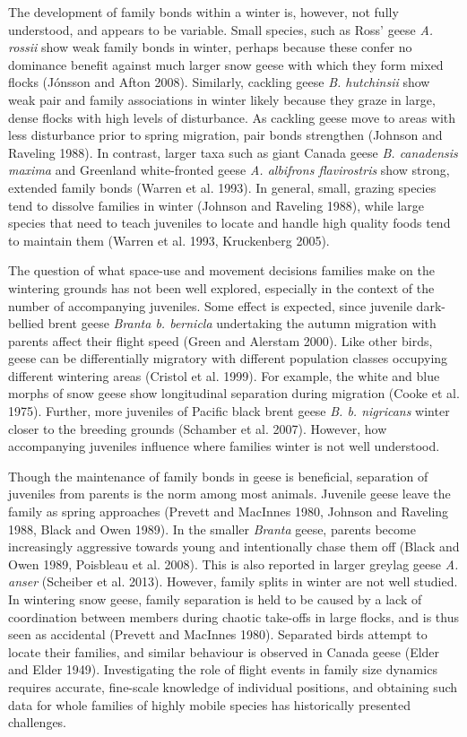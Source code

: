 \documentclass[10pt,twocolumn]{paper}
\begin{document}
The development of family bonds within a winter is, however, not fully
understood, and appears to be variable. Small species, such as Ross'
geese \emph{A. rossii} show weak family bonds in winter, perhaps because
these confer no dominance benefit against much larger snow geese with
which they form mixed flocks (Jónsson and Afton 2008). Similarly,
cackling geese \emph{B. hutchinsii} show weak pair and family
associations in winter likely because they graze in large, dense flocks
with high levels of disturbance. As cackling geese move to areas with
less disturbance prior to spring migration, pair bonds strengthen
(Johnson and Raveling 1988). In contrast, larger taxa such as giant
Canada geese \emph{B. canadensis maxima} and Greenland white-fronted
geese \emph{A. albifrons flavirostris} show strong, extended family
bonds (Warren et al. 1993). In general, small, grazing species tend to
dissolve families in winter (Johnson and Raveling 1988), while large
species that need to teach juveniles to locate and handle high quality
foods tend to maintain them (Warren et al. 1993, Kruckenberg 2005).

The question of what space-use and movement decisions families make on
the wintering grounds has not been well explored, especially in the
context of the number of accompanying juveniles. Some effect is
expected, since juvenile dark-bellied brent geese \emph{Branta b.
bernicla} undertaking the autumn migration with parents affect their
flight speed (Green and Alerstam 2000). Like other birds, geese can be
differentially migratory with different population classes occupying
different wintering areas (Cristol et al. 1999). For example, the white
and blue morphs of snow geese show longitudinal separation during
migration (Cooke et al. 1975). Further, more juveniles of Pacific black
brent geese \emph{B. b. nigricans} winter closer to the breeding grounds
(Schamber et al. 2007). However, how accompanying juveniles influence
where families winter is not well understood.

Though the maintenance of family bonds in geese is beneficial,
separation of juveniles from parents is the norm among most animals.
Juvenile geese leave the family as spring approaches (Prevett and
MacInnes 1980, Johnson and Raveling 1988, Black and Owen 1989). In the
smaller \emph{Branta} geese, parents become increasingly aggressive
towards young and intentionally chase them off (Black and Owen 1989,
Poisbleau et al. 2008). This is also reported in larger greylag geese
\emph{A. anser} (Scheiber et al. 2013). However, family splits in winter
are not well studied. In wintering snow geese, family separation is held
to be caused by a lack of coordination between members during chaotic
take-offs in large flocks, and is thus seen as accidental (Prevett and
MacInnes 1980). Separated birds attempt to locate their families, and
similar behaviour is observed in Canada geese (Elder and Elder 1949).
Investigating the role of flight events in family size dynamics requires
accurate, fine-scale knowledge of individual positions, and obtaining
such data for whole families of highly mobile species has historically
presented challenges.
\end{document}
